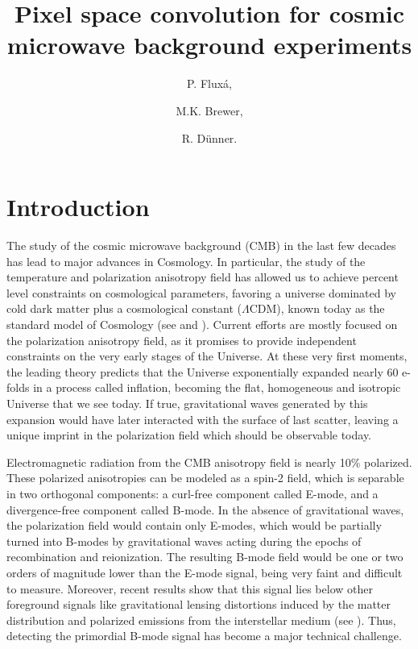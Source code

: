 \documentclass[a4paper,11pt]{article}
\title{\boldmath Pixel space convolution for cosmic microwave background experiments}
\author[a]{P. Flux\'a, }
\author[b]{M.K. Brewer, }
\author[a]{R. D\"unner.}
\affiliation[a]{Instituto de Astrof\'isica, Pontificia Universidad Cat\'olica de Chile ,\\Vicu\~na Mackenna 4860, Chile}
\affiliation[b]{Department of Astronomy, Johns Hopkins University,\\Baltimore MD, USA}
\begin{document}
\maketitle
\flushbottom


\section{Introduction}


The study of the cosmic microwave background (CMB) in the last few decades has lead to major advances in Cosmology. In particular, the study of the temperature and polarization anisotropy field has allowed us to achieve percent level constraints on cosmological parameters, favoring a universe dominated by cold dark matter plus a cosmological constant ($\Lambda$CDM), known today as the standard model of Cosmology (see \cite{2013ApJS..208...19H} and \cite{2016A&A...594A..12P}). Current efforts are mostly focused on the polarization anisotropy field, as it promises to provide independent constraints on the very early stages of the Universe. At these very first moments, the leading theory predicts that the Universe exponentially expanded nearly 60 e-folds in a process called inflation, becoming the flat, homogeneous and isotropic Universe that we see today. If true, gravitational waves generated by this expansion would have later interacted with the surface of last scatter, leaving a unique imprint in the polarization field which should be observable today.

Electromagnetic radiation from the CMB anisotropy field is nearly 10\% polarized. These polarized anisotropies can be modeled as a spin-2 field, which is separable in two orthogonal components: a curl-free component called E-mode, and a divergence-free component called B-mode. In the absence of gravitational waves, the polarization field would contain only E-modes, which would be partially turned into B-modes by gravitational waves acting during the epochs of recombination and reionization. The resulting B-mode field would be one or two orders of magnitude lower than the E-mode signal, being very faint and difficult to measure. Moreover, recent results show that this signal lies below other foreground signals like gravitational lensing distortions induced by the matter distribution and polarized emissions from the interstellar medium (see \cite{2018PhRvL.121v1301B}). Thus, detecting the primordial B-mode signal has become a major technical challenge.
\end{document}
